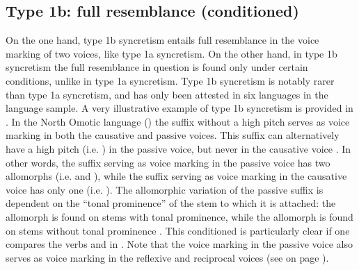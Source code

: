 \subsection{Type 1b: full resemblance (conditioned)} \label{resemblance-type1b}
On the one hand, type 1b syncretism entails full resemblance in the voice marking of two voices, like type 1a syncretism. On the other hand, in type 1b syncretism the full resemblance in question is found only under certain conditions, unlike in type 1a syncretism. Type 1b syncretism is notably rarer than type 1a syncretism, and has only been attested in six languages in the language sample. A very illustrative example of type 1b syncretism is provided in . In the North Omotic language  () the suffix  without a high pitch serves as voice marking in both the causative and passive voices. This suffix can alternatively have a high pitch (i.e. ) in the passive voice, but never in the causative voice \citep[1008]{wakasa:2008}. In other words, the suffix serving as voice marking in the passive voice has two allomorphs (i.e.  and ), while the suffix serving as voice marking in the causative voice has only one (i.e. ). The allomorphic variation of the passive suffix is dependent on the “tonal prominence” of the stem to which it is attached: the allomorph  is found on stems with tonal prominence, while the allomorph  is found on stems without tonal prominence \citep[84ff., 1013]{wakasa:2008}. This conditioned  is particularly clear if one compares the verbs  and  in . Note that the voice marking in the passive voice also serves as voice marking in the reflexive and reciprocal voices (see  on page \pageref{tab:ch5:caus-pass-antc}).

